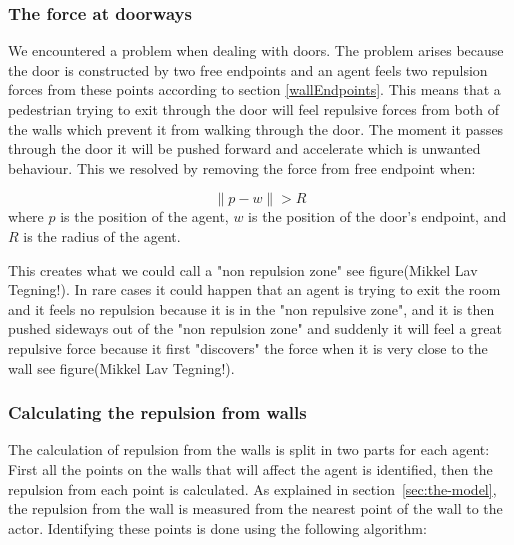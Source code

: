 \subsubsection{The force at doorways}
We encountered a problem when dealing with doors. The problem arises because 
the door is constructed by two free endpoints and an agent feels two repulsion 
forces from these points according to section \ref{wallEndpoints}. This means 
that a pedestrian trying to exit through the door will feel repulsive forces 
from both of the walls which prevent it from walking through the door. The moment it 
passes through the door it will be pushed forward and accelerate which is unwanted 
behaviour. This we resolved by removing the force from free endpoint when:

\begin{equation}
\| p - w \| > R
\end{equation}
where $ p $ is the position of the agent, $ w $ is the position of the door's endpoint, 
and $ R $ is the radius of the agent.

This creates what we could call a "non repulsion zone" see figure(Mikkel Lav Tegning!).
In rare cases it could happen that an agent is trying to exit the room and it feels 
no repulsion because it is in the "non repulsive zone", and it is then pushed sideways out 
of the "non repulsion zone" and suddenly it will feel a great repulsive force because 
it first "discovers" the force when it is very close to the wall see figure(Mikkel Lav Tegning!).

\subsubsection{Calculating the repulsion from walls}
The calculation of repulsion from the walls is split in two parts for each 
agent: First all the points on the walls that will affect the agent is 
identified, then the repulsion from each point is calculated. As explained in 
section~\ref{sec:the-model}, the repulsion from the wall is measured from the 
nearest point of the wall to the actor. Identifying these points is done using 
the following algorithm:

